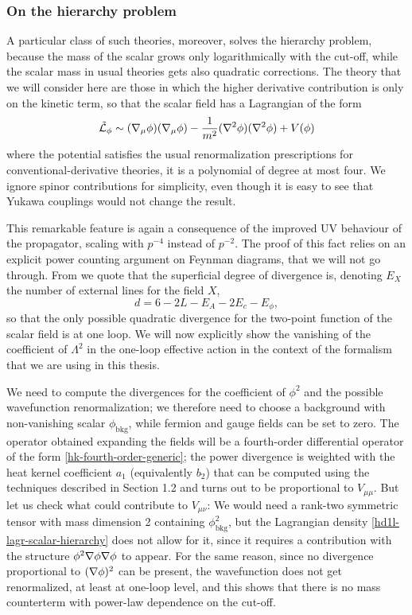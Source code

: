 \subsubsection{On the hierarchy problem}

A particular class of such theories, moreover, solves the hierarchy problem, because the mass of the scalar grows only logarithmically with the cut-off, while the scalar mass in usual theories gets also quadratic corrections. The theory that we will consider here are those in which the higher derivative contribution is only on the kinetic term, so that the scalar field has a Lagrangian of the form 
\begin{equation}\label{hd1l-lagr-scalar-hierarchy}
\tilde {{ \mathcal{L} }}_{\phi} \sim ({ \mathcal{\nabla} }_\mu \phi) ({ \mathcal{\nabla} }_\mu \phi) - \frac{1}{m^2}  ({ \mathcal{\nabla} }^2 \phi) ({ \mathcal{\nabla} }^2 \phi) + V(\phi) 
\end{equation}
where the potential satisfies the usual renormalization prescriptions for conventional-derivative theories, \ie it is a polynomial of degree at most four. We ignore spinor contributions for simplicity, even though it is easy to see that Yukawa couplings would not change the result.

This remarkable feature is again a consequence of the improved UV behaviour of the propagator, scaling with $p^{-4}$ instead of $p^{-2}$. The proof of this fact relies on an explicit power counting argument on Feynman diagrams, that we will not go through.
From \cite{Grinstein:2008qq} we quote that the superficial degree of divergence is, denoting $E_X$ the number of external lines for the field $X$,
\begin{equation}
d = 6 - 2 L - E_A - 2 E_c - E_\phi,
\end{equation}
so that the only possible quadratic divergence for the two-point function of the scalar field is at one loop.
We will now explicitly show the vanishing of the coefficient of $\Lambda^2$ in the one-loop effective action in the context of the formalism that we are using in this thesis.

We need to compute the divergences for the coefficient of $\phi^2$ and the possible wavefunction renormalization; we therefore need to choose a background with non-vanishing scalar $\phi_{\text{bkg}}$, while fermion and gauge fields can be set to  zero. The operator obtained expanding the fields will be a fourth-order differential operator of the form \eqref{hk-fourth-order-generic}; the power divergence is weighted with the heat kernel coefficient $a_1$ (equivalently $ b_2$) that can be computed using the techniques described in Section 1.2 and turns out to be proportional to $V_{\mu\mu}$. But let us check what could contribute to $V_{\mu\nu}$: We would need a rank-two symmetric tensor with mass dimension 2 containing $\phi_{\text{bkg}}^2$, but the Lagrangian density \eqref{hd1l-lagr-scalar-hierarchy} does not allow for it, since it requires a contribution with the structure $\phi^2 { \mathcal{\nabla} } \phi { \mathcal{\nabla} } \phi$ to appear. For the same reason, since no divergence proportional to $({ \mathcal{\nabla} } \phi)^2$ can be present, the wavefunction does not get renormalized, at least at one-loop level, and this shows that there is no mass counterterm with power-law dependence on the cut-off.




